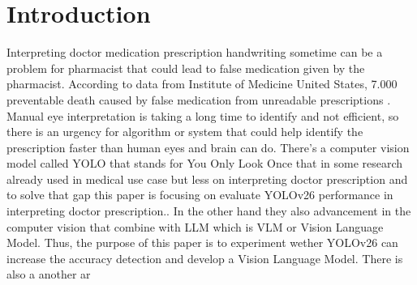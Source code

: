\section{Introduction}\label{sec:introduction}
Interpreting doctor medication prescription handwriting sometime can be a problem for pharmacist that could lead to false medication given by the pharmacist. According to data from Institute of Medicine United States, 7.000 preventable death caused by false medication from unreadable prescriptions \cite{achkar2019medical}. Manual eye interpretation is taking a long time to identify and not efficient, so there is an urgency for algorithm or system that could help identify the prescription faster than human eyes and brain can do. There's a computer vision model called YOLO that stands for You Only Look Once that in some research already used in medical use case but less on interpreting doctor prescription and to solve that gap this paper is focusing on evaluate YOLOv26 performance in interpreting doctor prescription.\cite{sapkota2025yolo26}. In the other hand they also advancement in the computer vision that combine with LLM which is VLM or Vision Language Model. Thus, the purpose of this paper is to experiment wether YOLOv26 can increase the accuracy detection and develop a Vision Language Model. There is also a another ar

